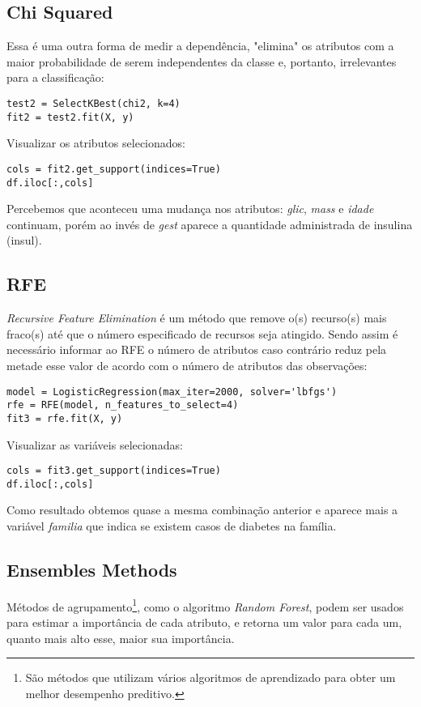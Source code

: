 \subsection{Chi Squared}
Essa é uma outra forma de medir a dependência, "elimina" os atributos com a maior probabilidade de serem independentes da classe e, portanto, irrelevantes para a classificação:
\begin{lstlisting}[]
test2 = SelectKBest(chi2, k=4)
fit2 = test2.fit(X, y)
\end{lstlisting}

Visualizar os atributos selecionados:
\begin{lstlisting}[]
cols = fit2.get_support(indices=True)
df.iloc[:,cols]
\end{lstlisting}

Percebemos que aconteceu uma mudança nos atributos: \textit{glic}, \textit{mass} e \textit{idade} continuam, porém ao invés de \textit{gest} aparece a quantidade administrada de insulina (insul).

\subsection{RFE}
\textit{Recursive Feature Elimination} é um método que remove o(s) recurso(s) mais fraco(s) até que o número especificado de recursos seja atingido. Sendo assim é necessário informar ao RFE o número de atributos caso contrário reduz pela metade esse valor de acordo com o número de atributos das observações:
\begin{lstlisting}[]
model = LogisticRegression(max_iter=2000, solver='lbfgs')
rfe = RFE(model, n_features_to_select=4)
fit3 = rfe.fit(X, y)
\end{lstlisting}

Visualizar as variáveis selecionadas:
\begin{lstlisting}[]
cols = fit3.get_support(indices=True)
df.iloc[:,cols]
\end{lstlisting}

Como resultado obtemos quase a mesma combinação anterior e aparece mais a variável \textit{familia } que indica se existem casos de diabetes na família.

\subsection{Ensembles Methods}
Métodos de agrupamento\footnote{São métodos que utilizam vários algoritmos de aprendizado para obter um melhor desempenho preditivo.}, como o algoritmo \textit{Random Forest}, podem ser usados para estimar a importância de cada atributo, e retorna um valor para cada um, quanto mais alto esse, maior sua importância.


